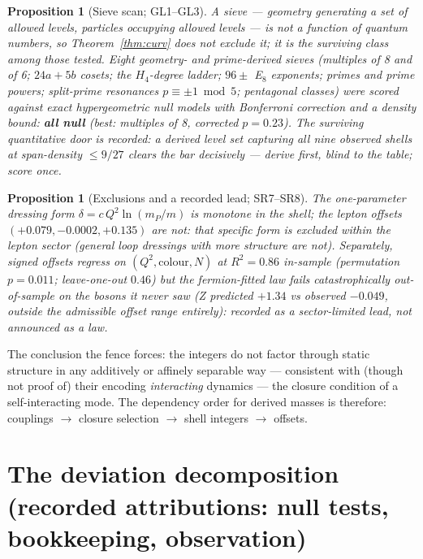 \documentclass[12pt]{article}
\newtheorem{proposition}[theorem]{Proposition}
\theoremstyle{definition}
\theoremstyle{remark}
\begin{document}
\begin{proposition}[Sieve scan; GL1--GL3]\label{prop:sieve}
A \emph{sieve} --- geometry generating a set of allowed levels, particles occupying allowed levels --- is not a function of quantum numbers, so Theorem~\ref{thm:curv} does not exclude it; it is the surviving class among those tested. Eight geometry- and prime-derived sieves (multiples of 8 and of 6; $24a+5b$ cosets; the $H_4$-degree ladder; $96\pm$ E$_8$ exponents; primes and prime powers; split-prime resonances $p \equiv \pm1 \bmod 5$; pentagonal classes) were scored against exact hypergeometric null models with Bonferroni correction and a density bound: \textbf{all null} (best: multiples of 8, corrected $p = 0.23$). The surviving quantitative door is recorded: a \emph{derived} level set capturing all nine observed shells at span-density $\le 9/27$ clears the bar decisively --- derive first, blind to the table; score once.
\end{proposition}

\begin{proposition}[Exclusions and a recorded lead; SR7--SR8]\label{prop:lead}
The one-parameter dressing form $\delta = c\,Q^2\ln(m_P/m)$ is monotone in the shell; the lepton offsets $(+0.079, -0.0002, +0.135)$ are not: that specific form is excluded within the lepton sector (general loop dressings with more structure are not). Separately, signed offsets regress on $(Q^2, \mathrm{colour}, N)$ at $R^2 = 0.86$ in-sample (permutation $p = 0.011$; leave-one-out $0.46$) but the fermion-fitted law fails catastrophically out-of-sample on the bosons it never saw (Z predicted $+1.34$ vs observed $-0.049$, outside the admissible offset range entirely): recorded as a sector-limited lead, not announced as a law.
\end{proposition}

The conclusion the fence forces: the integers do not factor through static structure in any additively or affinely separable way --- consistent with (though not proof of) their encoding \emph{interacting} dynamics --- the closure condition of a self-interacting mode. The dependency order for derived masses is therefore: couplings $\to$ closure selection $\to$ shell integers $\to$ offsets.

\section{The deviation decomposition (recorded attributions: null tests, bookkeeping, observation)}\label{sec:decomp}
\end{document}
